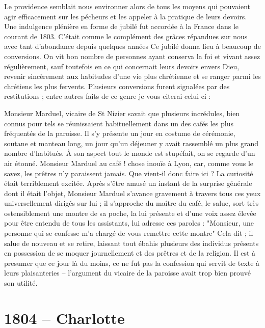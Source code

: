 \documentclass[11pt,a4paper]{report}
\begin{document}
Le providence semblait nous environner alors de tous les moyens qui pouvaient agir efficacement sur les pécheurs et les appeler à la pratique de leurs devoirs. Une indulgence plénière en forme de jubilé fut accordée à la France dans le courant de 1803. C'était comme le complément des grâces répandues sur nous avec tant d'abondance depuis quelques années Ce jubilé donna lieu à beaucoup de conversions. On vit bon nombre de personnes ayant conserva la foi et vivant assez régulièrement, sauf toutefois en ce qui concernait leurs devoirs envers Dieu, revenir sincèrement aux habitudes d'une vie plus chrétienne et se ranger parmi les chrétiens les plus fervents. Plusieurs conversions furent signalées par des restitutions ; entre autres faits de ce genre je vous citerai celui ci :

Monsieur Marduel, vicaire de St Nizier savait que plusieurs incrédules, bien connus pour tels se réunissaient habituellement dans un des cafés les plus fréquentés de la paroisse. Il s'y présente un jour en costume de cérémonie, soutane et manteau long, un jour qu'un déjeuner y avait rassemblé un plus grand nombre d'habitués. À son aspect tout le monde est stupéfait, on se regarde d'un air étonné. Monsieur Marduel au café ! chose inouïe à Lyon, car, comme vous le savez, les prêtres n'y paraissent jamais. Que vient-il donc faire ici ? La curiosité était terriblement excitée. Après s'être amusé un instant de la surprise générale dont il était l'objet, Monsieur Marduel s'avance gravement à travers tous ces yeux universellement dirigés sur lui ; il s'approche du maître du café, le salue, sort très ostensiblement une montre de sa poche, la lui présente et d'une voix assez élevée pour être entendu de tous les assistants, lui adresse ces paroles : "Monsieur, une personne qui se confesse m'a chargé de vous remettre cette montre" Cela dit ; il salue de nouveau et se retire, laissant tout ébahis plusieurs des individus présents en possession de se moquer journellement et des prêtres et de la religion. Il est à presumer que ce jour là du moins, ce ne fut pas la confession qui servit de texte à leurs plaisanteries -- l'argument du vicaire de la paroisse avait trop bien prouvé son utilité.

\section*{1804 -- Charlotte}
\end{document}
